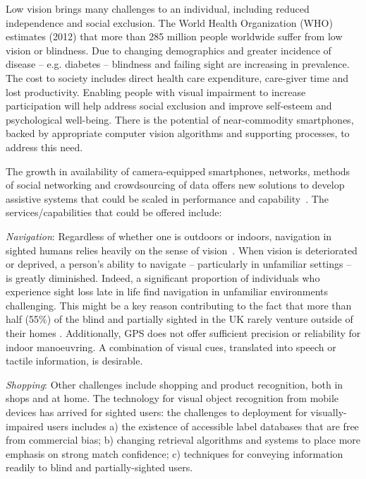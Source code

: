Low vision brings many challenges to an individual, including reduced independence and social exclusion. The World Health Organization (WHO) estimates (2012) that more than 285 million people worldwide suffer from low vision or blindness. Due to changing demographics and greater incidence of disease -- e.g. diabetes -- blindness and failing sight are increasing in prevalence.  The cost to society includes direct health care expenditure, care-giver time and lost productivity.  Enabling people with visual impairment to increase participation will help address social exclusion and improve self-esteem and psychological well-being. There is the potential of near-commodity smartphones, backed by appropriate computer vision algorithms and supporting processes, to address this need.

The growth in availability of camera-equipped smartphones, networks, methods of social networking and crowdsourcing of data offers new solutions to develop assistive systems that could be scaled in performance and capability~\cite{Manduchi2012,Worsfold2010}. The services/capabilities that could be offered include:

\emph{Navigation}: Regardless of whether one is outdoors or indoors, navigation in sighted humans relies heavily on the sense of vision~\citep{kalia2008learning,tsuji2005landmarks}. When vision is deteriorated or deprived, a person's ability to navigate -- particularly in unfamiliar settings -- is greatly diminished. Indeed, a significant proportion of individuals who experience sight loss late in life find navigation in unfamiliar environments challenging. This might be a key reason contributing to the fact that more than half (55\%) of the blind and partially sighted in the UK rarely venture outside of their homes \citep{Worsfold2010}. Additionally, GPS does not offer sufficient precision or reliability for indoor manoeuvring. A combination of visual cues, translated into speech or tactile information, is desirable.

\emph{Shopping}: Other challenges include shopping and product recognition, both in shops and at home. The technology for visual object recognition from mobile devices has arrived for sighted users: the challenges to deployment for visually-impaired users includes a) the existence of accessible label databases that are free from commercial bias; b) changing retrieval algorithms and systems to place more emphasis on strong match confidence; c) techniques for conveying information readily to blind and partially-sighted users.

